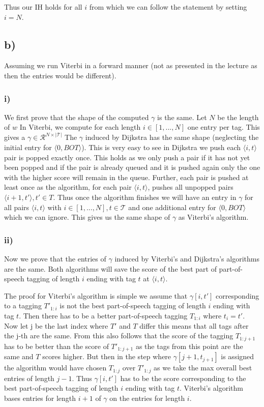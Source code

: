 \documentclass[a4paper,12pt]{ETHexercise}
\begin{document}
Thus our IH holds for all $i$ from which we can follow the statement by setting $i = N$.

\subsection*{b)}
Assuming we run Viterbi in a forward manner (not as presented in the lecture as then the entries would be different).

\subsubsection*{i)}
We first prove that the shape of the computed $\gamma$ is the same.
Let $N$ be the length of $w$
In Viterbi, we compute for each length $i \in [1,...,N] $ one entry per tag. This gives a $\gamma \in \mathcal{R}^{N \times |\mathcal{T}|}$
The $\gamma$ induced by Dijkstra has the same shape (neglecting the initial entry for $\langle 0, BOT\rangle$).
This is very easy to see in Dijkstra we push each $\langle i, t\rangle$ pair is popped exactly once. This holds as we only push a pair if it has not yet been popped and if the pair is already queued and it is pushed again only the one with the higher score will remain in the queue.
Further, each pair is pushed at least once as the algorithm, for each pair $\langle i, t\rangle$, pushes all unpopped pairs $\langle i+1, t'\rangle, t' \in T$.
Thus once the algorithm finishes we will have an entry in $\gamma$ for all pairs $\langle i, t\rangle$ with $i \in [1,...,N], t \in \mathcal{T}$ and one additional entry for $\langle 0, BOT\rangle$ which we can ignore.
This gives us the same shape of $\gamma$ as Viterbi's algorithm.

\subsubsection*{ii)}
Now we prove that the entries of $\gamma$ induced by Viterbi's and Dijkstra's algorithms are the same.
Both algorithms will save the score of the best part of part-of-speech tagging of length $i$ ending with tag $t$ at $\langle i, t\rangle$.

The proof for Viterbi's algorithm is simple we assume that $\gamma[i,t']$ corresponding to a tagging $T'_{1:i}$ is not the best part-of-speech tagging of length $i$ ending with tag $t$. Then there has to be a better part-of-speech tagging $T_{1:i}$  where $t_i = t'$. Now let j be the last index where $T'$ and $T$ differ this means that all tags after the j-th are the same. From this also follows that the score of the tagging $T_{1:j+1}$ has to be better than the score of $T'_{1:j+1}$ as the tags from this point are the same and $T$ scores higher. But then in the step where $\gamma[j+1, t_{j+1}]$ is assigned the algorithm would have chosen $T_{1:j}$ over $T'_{1:j}$ as we take the max overall best entries of length $j-1$. Thus $\gamma[i,t']$ has to be the score corresponding to the best part-of-speech tagging of length $i$ ending with tag $t$. Viterbi's algorithm bases entries for length $i+1$ of $\gamma$ on the entries for length $i$. 
\end{document}
